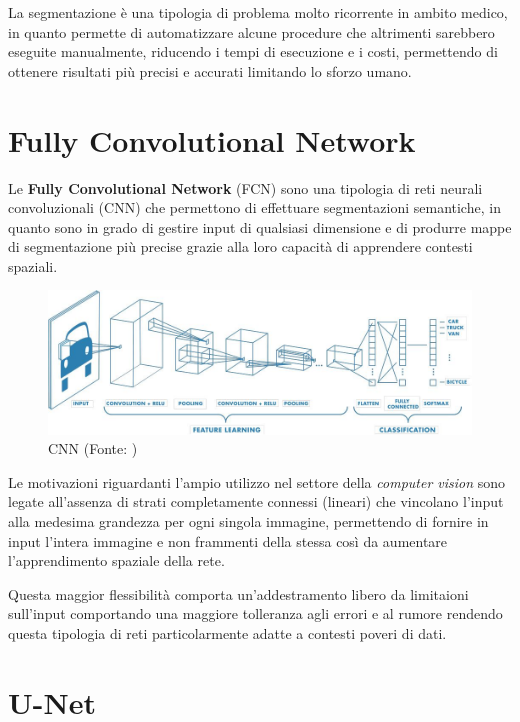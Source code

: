La segmentazione \`e una tipologia di problema molto ricorrente in ambito medico,
in quanto permette di automatizzare alcune procedure che altrimenti sarebbero
eseguite manualmente, riducendo i tempi di esecuzione e i costi,
permettendo di ottenere risultati pi\`u precisi e accurati limitando lo sforzo umano.


\section{Fully Convolutional Network}

Le \textbf{Fully Convolutional Network} (FCN) \cite{long2015fully} sono una tipologia di reti neurali convoluzionali (CNN) che permettono di effettuare segmentazioni semantiche, in quanto sono in grado di gestire input di qualsiasi dimensione e di produrre mappe di segmentazione pi\`u precise grazie alla loro capacit\`a di apprendere contesti spaziali.


\begin{figure}[!ht]
	\begin{adjustbox}{width=0.6\columnwidth, center}
		\includegraphics{./images/cnn.png}
	\end{adjustbox}
	\caption{CNN (Fonte: \cite{cnn_example})}
	\label{fig:cnn}
\end{figure}

Le motivazioni riguardanti l'ampio utilizzo nel settore della \textit{computer vision}
sono legate all'assenza di strati completamente connessi (lineari) che vincolano
l'input alla medesima grandezza per ogni singola immagine, permettendo di fornire in input l'intera immagine e non frammenti della stessa così da aumentare l'apprendimento spaziale della rete.

Questa maggior flessibilità comporta un'addestramento libero da limitaioni sull'input comportando una maggiore tolleranza agli errori e al rumore rendendo questa tipologia di reti particolarmente adatte a contesti poveri di dati.


\section{U-Net}

